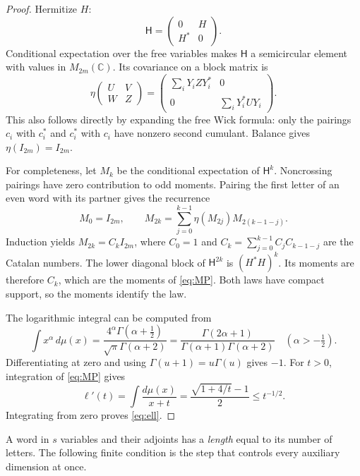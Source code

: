 \documentclass[11pt]{article}
\theoremstyle{remark}
\newcommand{\C}{\mathbb C}
\newcommand{\M}{M}
\begin{document}
\begin{proof}
Hermitize $H$:
\[
 \mathsf H=\begin{pmatrix}0&H\\H^*&0\end{pmatrix}.
\]
Conditional expectation over the free variables makes $\mathsf H$
a semicircular element with values in $\M_{2m}(\C)$.
Its covariance on a block matrix is
\begin{equation}
 \eta\begin{pmatrix}U&V\\W&Z\end{pmatrix}
  =
 \begin{pmatrix}
  \sum_iY_iZY_i^*&0\\
  0&\sum_iY_i^*UY_i
 \end{pmatrix}. \label{eq:eta}
\end{equation}
This also follows directly by expanding the free Wick formula:
only the pairings $c_i$ with $c_i^*$ and $c_i^*$ with $c_i$
have nonzero second cumulant. Balance gives $\eta(I_{2m})=I_{2m}$.

For completeness, let $M_k$ be the conditional expectation of
$\mathsf H^k$. Noncrossing pairings have zero contribution to
odd moments. Pairing the first letter of an even word with its
partner gives the recurrence
\[
 M_0=I_{2m},\qquad
 M_{2k}=\sum_{j=0}^{k-1}\eta(M_{2j})M_{2(k-1-j)}.
\]
Induction yields $M_{2k}=C_kI_{2m}$, where
$C_0=1$ and $C_k=\sum_{j=0}^{k-1}C_jC_{k-1-j}$ are the Catalan
numbers. The lower diagonal block of $\mathsf H^{2k}$ is
$(H^*H)^k$. Its moments are therefore $C_k$, which are the moments
of \eqref{eq:MP}. Both laws have compact support, so the moments
identify the law.

The logarithmic integral can be computed from
\[
 \int x^\alpha\,d\mu(x)
  =\frac{4^\alpha\Gamma(\alpha+\tfrac12)}
         {\sqrt{\pi}\Gamma(\alpha+2)}
  =\frac{\Gamma(2\alpha+1)}
         {\Gamma(\alpha+1)\Gamma(\alpha+2)}
       \quad(\alpha>-\tfrac12).
\]
Differentiating at zero and using
$\Gamma(u+1)=u\Gamma(u)$ gives $-1$.
For $t>0$, integration of \eqref{eq:MP} gives
\[
 \ell'(t)=\int\frac{d\mu(x)}{x+t}
     =\frac{\sqrt{1+4/t}-1}{2}\leq t^{-1/2}.
\]
Integrating from zero proves \eqref{eq:ell}.
\end{proof}

A word in $s$ variables and their adjoints has a \emph{length}
equal to its number of letters. The following finite condition
is the step that controls every auxiliary dimension at once.
\end{document}
